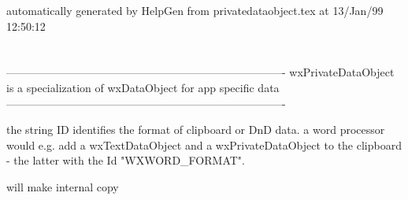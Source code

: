 automatically generated by HelpGen from privatedataobject.tex at 13/Jan/99 12:50:12
\section{}\label{wxprivatedataobject}


 ----------------------------------------------------------------------------
 wxPrivateDataObject is a specialization of wxDataObject for app specific data
 ----------------------------------------------------------------------------





\label{wxprivatedataobjectwxprivatedataobject}


\label{wxprivatedataobjectdtor}


\label{wxprivatedataobjectgetformat}


\label{wxprivatedataobjectsetid}


 the string ID identifies the format of clipboard or DnD data. a word
 processor would e.g. add a wxTextDataObject and a wxPrivateDataObject
 to the clipboard - the latter with the Id "WXWORD\_FORMAT".

\label{wxprivatedataobjectgetid}


\label{wxprivatedataobjectsetdata}


 will make internal copy

\label{wxprivatedataobjectgetdatasize}


\label{wxprivatedataobjectgetdata}


